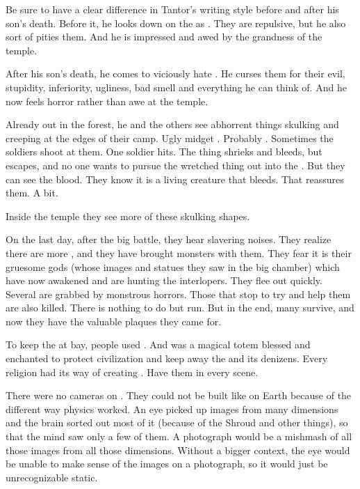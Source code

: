 Be sure to have a clear difference in Tantor's writing style before and after his son's death. 
Before it, he looks down on the \meccara as . 
They are repulsive, but he also sort of pities them. 
And he is impressed and awed by the grandness of the temple. 

After his son's death, he comes to viciously hate \meccara. 
He curses them for their evil, stupidity, inferiority, ugliness, bad smell and everything he can think of. 
And he now feels horror rather than awe at the temple. 

Already out in the forest, he and the others see abhorrent things skulking and creeping at the edges of their camp. 
Ugly midget \humanoids. 
Probably \meccara. 
Sometimes the soldiers shoot at them. 
One soldier hits. 
The thing shrieks and bleeds, but escapes, and no one wants to pursue the wretched thing out into the \wylde. 
But they can see the blood. 
They know it is a living creature that bleeds. 
That reassures them. 
A bit. 

Inside the temple they see more of these skulking shapes. 

On the last day, after the big battle, they hear slavering noises.
They realize there are more \meccara, and they have brought monsters with them. 
They fear it is their gruesome gods (whose images and statues they saw in the big chamber) which have now awakened and are hunting the interlopers. 
They flee out quickly.
Several are grabbed by monstrous horrors. 
Those that stop to try and help them are also killed. 
There is nothing to do but run. 
But in the end, many survive, and now they have the valuable plaques they came for. 



To keep the \wylde at bay, people used \eidola. 
And \eidolon was a magical totem blessed and enchanted to protect civilization and keep away the \wylde and its denizens. 
Every religion had its way of creating \eidola. 
Have them in every \wylde scene. 



There were no cameras on \Miith. 
They could not be built like on Earth because of the different way \Miithian physics worked. 
An eye picked up images from many dimensions and the brain sorted out most of it (because of the Shroud and other things), so that the mind saw only a few of them. 
A photograph would be a mishmash of all those images from all those dimensions. 
Without a bigger context, the eye would be unable to make sense of the images on a photograph, so it would just be unrecognizable static. 

